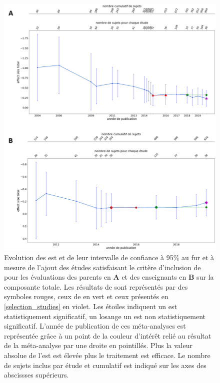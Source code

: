 \begin{figure}[h!]
  \centering
	\includegraphics[width=1\linewidth]{figures/chapter-2/meta-analysis-evolution-summary-effect-total} 
  \caption{Evolution des \gls{est} et de leur intervalle de confiance à 95\% au fur et à mesure de l'ajout des études satisfaisant le critère d'inclusion de \citet{Cortese2016} pour les évaluations des 
	parents en \textbf{A} et des enseignants en \textbf{B} sur la composante totale.
  Les résultats de \citep{Cortese2016} sont représentés par des symboles rouges, ceux de \citet{Bussalb2016clinical} en vert et ceux présentés en \ref{selection_studies} en violet. Les étoiles 
	indiquent un \gls{est} statistiquement significatif, un losange un \gls{est} non statistiquement significatif. L'année de publication de ces méta-analyses est représentée grâce à un point de la couleur 
	d'intérêt relié au résultat de la méta-analyse par une droite en pointillés.
	Plus la valeur absolue de l'\gls{est} est élevée plus le traitement est efficace.
	Le nombre de sujets inclus par étude et cumulatif est indiqué sur les axes des abscissses supérieurs.}
  \label{Figure:meta_analysis_evolution_est_total}
\end{figure}

